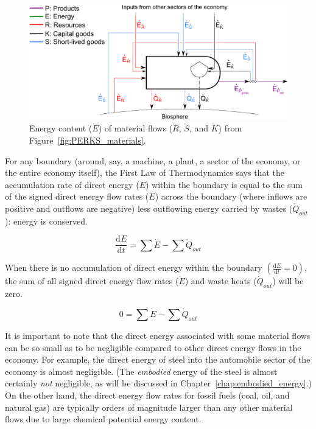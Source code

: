 \begin{figure}[h!]
\centering
\includegraphics[width=0.8\linewidth]{Part_2/Chapter_Energy/images/PERKS_basic_unit_energy_content.pdf}
\caption{Energy content ($\dot{E}$) of material flows 
($\dot{R}$, $\dot{S}$, and $\dot{K}$) 
from Figure~\ref{fig:PERKS_materials}.}
\label{fig:PERKS_energy_content}
\end{figure}

For any boundary (around, say, a machine, a plant,
a sector of the economy, or the entire economy itself), 
the First Law of Thermodynamics says that 
the accumulation rate of direct energy ($E$) within the boundary
is equal to the sum of the signed direct energy flow rates ($\dot{E}$)
across the boundary (where inflows are positive and outflows are negative)
less outflowing energy carried by wastes ($\dot{Q}_{out}$): 
energy is conserved.

\begin{equation} \label{eq:First_Law_with_accumulation}
	\frac{\mathrm{d}E}{\mathrm{d}t} = \sum \dot{E} - \sum \dot{Q}_{out}
\end{equation}

When there is no accumulation of direct energy within the boundary
$\left( \frac{\mathrm{d}E}{\mathrm{d}t} = 0 \right)$, the sum of all 
signed direct energy flow rates ($\dot{E}$) 
and waste heats ($\dot{Q}_{out}$) will be zero.

\begin{equation} \label{eq:First_Law_no_accumulation}
	0 = \sum \dot{E} - \sum \dot{Q}_{out}
\end{equation}

It is important to note that the direct energy associated with some material flows can
be so small as to be negligible compared to other direct energy flows in the economy.
For example, the direct energy of steel into the automobile sector of the economy 
is almost negligible. (The \emph{embodied} energy of the steel is almost certainly
\emph{not} negligible, as will be discussed in Chapter~\ref{chap:embodied_energy}.)
On the other hand, the direct energy flow rates for 
fossil fuels
(coal, oil, and natural gas)
are typically orders of magnitude larger than any other 
material flows due to large chemical potential energy content.

